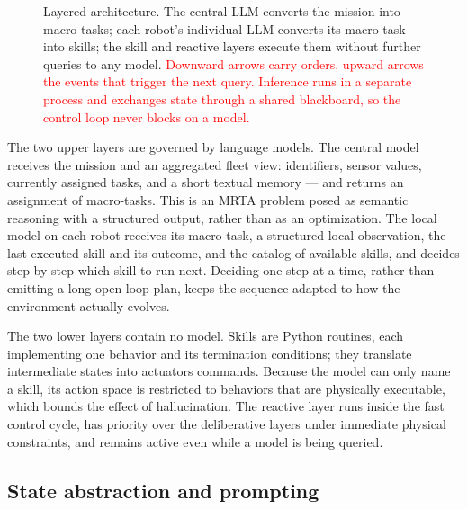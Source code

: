 \documentclass[conference]{IEEEtran}
\newif\ifrevmarks\revmarkstrue
\newcommand{\rev}[1]{\ifrevmarks\textcolor{red}{#1}\else#1\fi}
\begin{document}
\begin{figure}[t]
\caption{Layered architecture. The central LLM converts the mission into
macro-tasks; each robot's individual LLM converts its macro-task into
skills; the skill and reactive layers execute them without further
queries to any model. \rev{Downward arrows carry orders, upward arrows the
events that trigger the next query. Inference runs in a separate process
and exchanges state through a shared blackboard, so the control loop
never blocks on a model.}}
\label{fig:arch}
\end{figure}

The two upper layers are governed by language models. The central model
receives the mission and an aggregated fleet view: identifiers,
sensor values, currently assigned tasks, and a short textual memory --- and
returns an assignment of macro-tasks. This is an MRTA problem posed as
semantic reasoning with a structured output, rather than as an
optimization. The local model on each robot receives its macro-task, a
structured local observation, the last executed skill and its outcome, and
the catalog of available skills, and decides step by step which skill to
run next. Deciding one step at a time, rather than emitting a long
open-loop plan, keeps the sequence adapted to how the environment
actually evolves.

The two lower layers contain no model. Skills are Python routines, each
implementing one behavior and its termination conditions; they translate
intermediate states into actuators commands. Because the model can only name a
skill, its action space is restricted to behaviors that are physically
executable, which bounds the effect of hallucination. The reactive layer
runs inside the fast control cycle, has priority over the deliberative
layers under immediate physical constraints, and remains active even
while a model is being queried.

\subsection{State abstraction and prompting}
\end{document}
